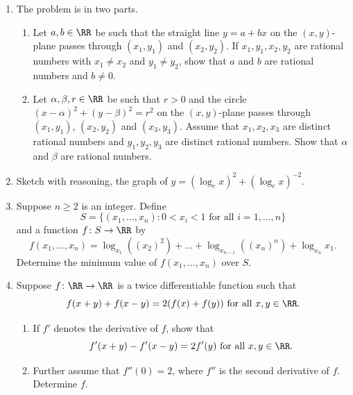 \documentclass[numbers=endperiod, 11pt]{scrartcl}
\begin{document}
\begin{enumerate}
    \item The problem is in two parts.
          \begin{enumerate}
              \item Let $a, b \in \RR$ be such that
                    the straight line $y = a + bx$ on the
                    $(x, y)$-plane passes through
                    $(x_1, y_1)$ and $(x_2, y_2)$. If
                    $x_1, y_1, x_2, y_2$ are rational
                    numbers with $x_1 \neq x_2$ and
                    $y_1 \neq y_2$, show that $a$ and $b$ are
                    rational numbers and $b \neq 0$.
              \item Let $\alpha, \beta, r \in \RR$ be such
                    that $r > 0$ and the circle
                    $(x - \alpha)^2 + (y - \beta)^2 = r^2$ on
                    the $(x, y)$-plane passes through
                    $(x_1, y_1)$, $(x_2, y_2)$ and
                    $(x_3, y_3)$. Assume that $x_1, x_2, x_3$
                    are distinct rational numbers and
                    $y_1, y_2, y_3$ are distinct rational
                    numbers. Show that $\alpha$ and $\beta$
                    are rational numbers.
          \end{enumerate}

    \item Sketch with reasoning, the graph of
          $y = (\log_e x)^2 + (\log_e x)^{-2}$.

    \item Suppose $n \geq 2$ is an integer. Define
          \[S = \{(x_1, \dots, x_n) : 0 < x_i < 1 \text{ for all } i = 1, \dots, n\}\]
          and a function $f\colon S \to \RR$ by
          \[f(x_1, \dots, x_n) = \log_{x_1} ((x_2)^2) + \dots + \log_{x_{n-1}} ((x_n)^n) + \log_{x_n} x_1.\]
          Determine the minimum value of
          $f(x_1, \dots, x_n)$ over $S$.

    \item Suppose $f\colon \RR \to \RR$ is a twice
          differentiable function such that
          \[f(x + y) + f(x - y) = 2(f(x) + f(y)) \text{ for all } x, y \in \RR.\]
          \begin{enumerate}
              \item If $f'$ denotes the derivative of $f$,
                    show that
                    \[f'(x + y) - f'(x - y) = 2f'(y) \text{ for all } x, y \in \RR.\]
              \item Further assume that $f''(0) = 2$, where
                    $f''$ is the second derivative of $f$.
                    Determine $f$.
          \end{enumerate}


\end{enumerate}
\end{document}
